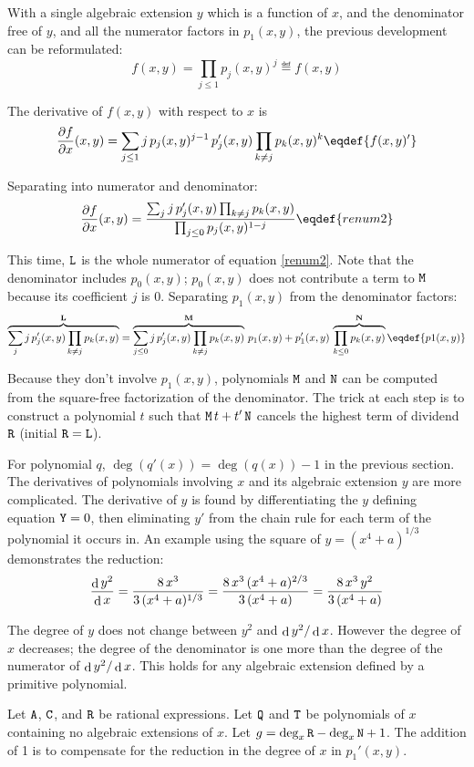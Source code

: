 With a single algebraic extension $y$ which is a function of
$x$, and the denominator free of $y$, and all the numerator factors in
$p_1(x,y)$, the previous development can be reformulated:
$$f(x,y)=\prod_{j\le1}p_j(x,y)^j\eqdef{f(x,y)}$$

The derivative of $f(x,y)$ with respect to $x$ is
$${\partial{f}\over \partial{x}}(x,y)=\sum_{j\le1}j\,p_j(x,y)^{j-1}\,{p_j'}(x,y)\prod_{k\neq j}p_k(x,y)^k
  \eqdef{f(x,y)'}$$

Separating into numerator and denominator:
$${\partial{f}\over \partial{x}}(x,y)
 ={\sum_{j}j\,{p_j'}(x,y)\prod_{k\neq j}p_k(x,y)
 \over\prod_{j\le0}p_j(x,y)^{1-j}}
\eqdef{renum2}$$

This time, ${\tt{L}}$ is the whole numerator of
equation \eqref{renum2}.  Note that the denominator includes
$p_0(x,y)$; $p_0(x,y)$ does not contribute a term to ${\tt{M}}$
because its coefficient $j$ is 0.  Separating $p_1(x,y)$ from the
denominator factors:
$$\overbrace{\sum_{j}j\,{p_j'}(x,y)\prod_{k\neq j} p_k(x,y)}^{\bf L}=
  \overbrace{\sum_{j\le0}j\,{p_j'}(x,y)\prod_{k\neq j}p_k(x,y)}^{{\bf M}}\,p_1(x,y)
  +{p_1'}(x,y)\,\overbrace{\prod_{k\le0}p_k(x,y)}^{{\bf N}}\eqdef{p1(x,y)}$$

Because they don't involve $p_1(x,y)$, polynomials ${\tt{M}}$ and
${\tt{N}}$ can be computed from the square-free factorization of the
denominator.  The trick at each step is to construct a polynomial
$t$ such that ${\tt{M}}\,t+t'\,{\tt{N}}$ cancels the
highest term of dividend ${\tt{R}}$ (initial ${\tt{R}}={\tt{L}}$).

For polynomial $q$, $\deg(q'(x))=\deg(q(x))-1$ in the previous
section.  The derivatives of polynomials involving $x$ and its
algebraic extension $y$ are more complicated.  The derivative of
$y$ is found by differentiating the $y$ defining equation
${\tt{Y}}=0$, then eliminating $y'$ from the chain rule for each term
of the polynomial it occurs in.  An example using the square of
$y=(x^4+a)^{1/3}$ demonstrates the reduction:
$${\mathop{\rm d}\nolimits{y^2}\over \mathop{\rm d}\nolimits{x}}=
  {8\,x^3\over3\,(x^4+a)^{1/3}}=
  {8\,x^3\,(x^4+a)^{2/3}\over3\,(x^4+a)}=
  {8\,x^3\,y^2\over3\,(x^4+a)}$$

The degree of $y$ does not change between $y^2$ and $\mathop{\rm d}\nolimits{y^2}/\mathop{\rm d}\nolimits{x}$.
However the degree of $x$ decreases; the degree of the denominator is
one more than the degree of the numerator of $\mathop{\rm d}\nolimits{y^2}/\mathop{\rm d}\nolimits{x}$.  This holds
for any algebraic extension defined by a primitive polynomial.

Let ${\tt{A}}$, ${\tt{C}}$, and ${\tt{R}}$ be rational expressions.
Let ${\tt{Q}}$ and ${\tt{T}}$ be polynomials of $x$ containing no
algebraic extensions of $x$.  Let $g=\deg_x{\tt{R}}-\deg_x{\tt{N}}+1$.
The addition of 1 is to compensate for the reduction in the degree of
$x$ in $p_1'(x,y)$.

